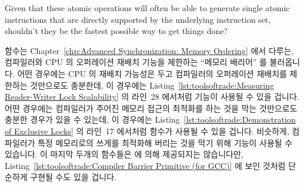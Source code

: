 \QuickQuiz{}
	Given that these atomic operations will often be able to
	generate single atomic instructions that are directly
	supported by the underlying instruction set, shouldn't
	they be the fastest possible way to get things done?
 \QuickQuizEnd

 함수는
Chapter~\ref{chp:Advanced Synchronization: Memory Ordering} 에서
다루는, 컴파일러와 CPU 의 오퍼레이션 재배치 기능을 제한하는 ``메모리 배리어''
를 불러옵니다.
어떤 경우에는 CPU 의 재배치 가능성은 두고 컴파일러의 오퍼레이션 재배치를
제한하는 것만으로도 충분한데, 이 경우에는
Listing~\ref{lst:toolsoftrade:Measuring Reader-Writer Lock Scalability} 의
라인~28 에서처럼  기능이 사용될 수 있을 겁니다.
어떤 경우에는 컴파일러가 주어진 메모리 접근의 최적화를 하는 것을 막는
것만으로도 충분한 경우가 있을 수 있는데, 이 경우에는 
Listing~\ref{lst:toolsoftrade:Demonstration of Exclusive Locks} 의 라인~17
에서처럼  함수가 사용될 수 있을 겁니다.
비슷하게, 컴파일러가 특정 메모리로의 쓰게를 최적화해 버리는 것을 막기 위해
 기능이 사용될 수 있습니다.
이 마지막 두개의 함수들은 \GCC 에 의해 제공되지는 않습니다만,
Listing~\ref{lst:toolsoftrade:Compiler Barrier Primitive (for GCC)}
에 보인 것처럼 단순하게 구현될 수도 있을 겁니다.
\iffalse

